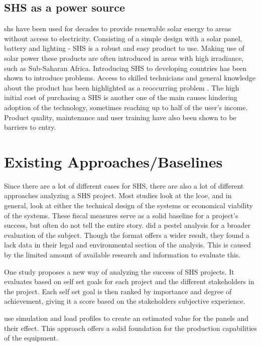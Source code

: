 \subsection{SHS as a power source}
\acrfull{shs} have been used for decades to provide renewable solar energy to areas without access to electricity. Consisting of a simple design with a solar panel, battery and lighting - SHS is a robust and easy product to use. Making use of solar power these products are often introduced in areas with high irradiance, such as Sub-Saharan Africa. Introducing SHS to developing countries has been shown to introduce problems. Access to skilled technicians and general knowledge about the product has been highlighted as a reoccurring problem \citep{chaureyAssessmentEvaluationPV2010}. The high initial cost of purchasing a SHS is another one of the main causes hindering adoption of the technology, sometimes reaching up to half of the user's income. Product quality, maintenance and user training have also been shown to be barriers to entry\citep{girardeauHouseholdSolarAdoption2018}. 


\section{Existing Approaches/Baselines}
Since there are a lot of different cases for SHS, there are also a lot of different approaches analyzing a SHS project. Most studies look at the \acrfull{lcoe}, and in general, look at either the technical design of the systems or economical viability of the systems. These fiscal measures serve as a solid baseline for a project's success, but often do not tell the entire story. \citep{thomasPESTLEAnalysisSolar2021a} did a \acrshort{pestel} analysis for a broader evaluation of the subject. Though the format offers a wider result, they found a lack data in their legal and environmental section of the analysis. This is caused by the limited amount of available research and information to evaluate this. 

One study proposes a new way of analyzing the success of SHS projects\citep{holtorfModelEvaluateSuccess2015}. It evaluates based on self set goals for each project and the different stakeholders in the project. Each self set goal is then ranked by  importance and degree of achievement, giving it a score based on the stakeholders subjective experience. 

\citep{lervikTechnoEconomicAnalysisRural2021} use simulation and load profiles to create an estimated value for the panels and their effect. This approach offers a solid foundation for the production capabilities of the equipment. 

